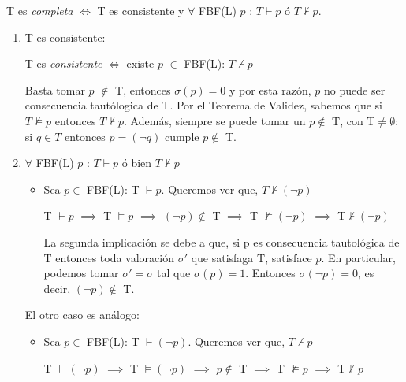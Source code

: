 T es \emph{completa} $\Leftrightarrow$  T es consistente y $\forall$  FBF(L)  $p$ : $T \vdash p$ ó $T \nvdash p$.
\begin{enumerate}
\item T es consistente: \newline

T es \emph{consistente} $\Leftrightarrow$ existe $p$ $\in$ FBF(L): $T \nvdash p$

Basta tomar $p$ $\notin$ T, entonces $\sigma(p)=0$ y por esta razón, $p$ no puede ser consecuencia tautólogica de T. Por el Teorema de Validez, sabemos que si $T \nvDash p$ entonces $T \nvdash p$.\newline
Además, siempre se puede tomar un $p\notin$ T, con T$\neq\emptyset$: si $q \in T$ entonces $p=(\neg q)$ cumple $p\notin$ T.

\item $\forall$  FBF(L)  $p$ : $T \vdash p$ ó bien $T \nvdash p$
\begin{itemize}
\item Sea $p \in$ FBF(L): T $\vdash p$. Queremos ver que, $T \nvdash (\neg p)$

T $\vdash p$ $\implies$ T $\vDash p$ $\implies$ $(\neg p) \notin$ T $\implies$ T $\nvDash (\neg p)$ $\implies$ T$\nvdash (\neg p)$


\small {La segunda implicación se debe a que, si p es consecuencia tautológica de T entonces toda valoración $\sigma'$ que satisfaga T, satisface $p$. En particular, podemos tomar $\sigma'=\sigma$ tal que $\sigma(p)=1$. Entonces $\sigma(\neg p)=0$, es decir, $(\neg p)\notin$ T.}
\end{itemize}
El otro caso es análogo:
\begin{itemize}
\item Sea $p \in$ FBF(L): T $\vdash (\neg p)$. Queremos ver que, $T \nvdash p$

T $\vdash (\neg p)$ $\implies$ T $\vDash (\neg p)$ $\implies$ $ p \notin $ T $\implies$ T $\nvDash p$ $\implies$ T$\nvdash p$

\end{itemize}

\end{enumerate}

